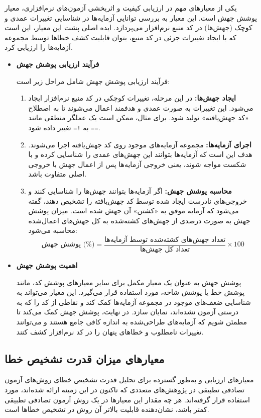 یکی از معیارهای مهم در ارزیابی کیفیت و اثربخشی آزمون‌های نرم‌افزاری، معیار پوشش جهش است. این معیار به بررسی توانایی آزمایه‌ها در شناسایی تغییرات عمدی و کوچک (جهش‌ها) در کد منبع نرم‌افزار می‌پردازد. ایده اصلی پشت این معیار، این است که با ایجاد تغییرات جزئی در کد منبع، بتوان قابلیت کشف خطاها توسط مجموعه آزمایه‌ها را ارزیابی کرد.

\begin{itemize}
	\item \textbf{فرآیند ارزیابی پوشش جهش}

فرآیند ارزیابی پوشش جهش شامل مراحل زیر است:

\begin{enumerate}
	\item \textbf{ایجاد جهش‌ها:} در این مرحله، تغییرات کوچکی در کد منبع نرم‌افزار ایجاد می‌شود. این تغییرات به صورت عمدی و هدفمند اعمال می‌شوند تا به اصطلاح «کد جهش‌یافته» تولید شود. برای مثال، ممکن است یک عملگر منطقی مانند \texttt{==} به \texttt{!=} تغییر داده شود.
	\item \textbf{اجرای آزمایه‌ها:} مجموعه آزمایه‌های موجود روی کد جهش‌یافته اجرا می‌شوند. هدف این است که آزمایه‌ها بتوانند این جهش‌های عمدی را شناسایی کرده و با شکست مواجه شوند، یعنی خروجی آزمایه‌ها پس از اعمال جهش با خروجی اصلی متفاوت باشد.
	\item \textbf{محاسبه پوشش جهش:} اگر آزمایه‌ها بتوانند جهش‌ها را شناسایی کنند و خروجی‌های نادرست ایجاد شده توسط کد جهش‌یافته را تشخیص دهند، گفته می‌شود که آزمایه موفق به «کشتن» آن جهش شده است. میزان پوشش جهش به صورت درصدی از جهش‌های کشته‌شده به کل جهش‌های اعمال‌شده محاسبه می‌شود:
	\[
	\text{پوشش جهش (\%)} = \frac{\text{تعداد جهش‌های کشته‌شده توسط آزمایه‌ها}}{\text{تعداد کل جهش‌ها}} \times 100
	\]
\end{enumerate}

	\item \textbf{اهمیت پوشش جهش}

پوشش جهش به عنوان یک معیار مکمل برای سایر معیارهای پوشش کد، مانند پوشش خط یا پوشش شاخه، مورد استفاده قرار می‌گیرد. این معیار می‌تواند به شناسایی ضعف‌های موجود در مجموعه آزمایه‌ها کمک کند و نقاطی از کد را که به درستی آزمون نشده‌اند، نمایان سازد. در نهایت، پوشش جهش کمک می‌کند تا مطمئن شویم که آزمایه‌های طراحی‌شده به اندازه کافی جامع هستند و می‌توانند تغییرات نامطلوب و خطاهای پنهان را در کد نرم‌افزار کشف کنند.

\end{itemize}

\subsection{معیارهای میزان قدرت تشخیص خطا}
معیارهای ارزیابی  و  به‌طور گسترده برای تحلیل قدرت تشخیص خطای روش‌های آزمون تصادفی تطبیقی در پژوهش‌های متعددی که تاکنون در این زمینه ارائه شده‌اند، مورد استفاده قرار گرفته‌اند. هر چه مقدار این معیارها در یک روش آزمون تصادفی تطبیقی کمتر باشد، نشان‌دهنده قابلیت بالاتر آن روش در تشخیص خطاها است.


